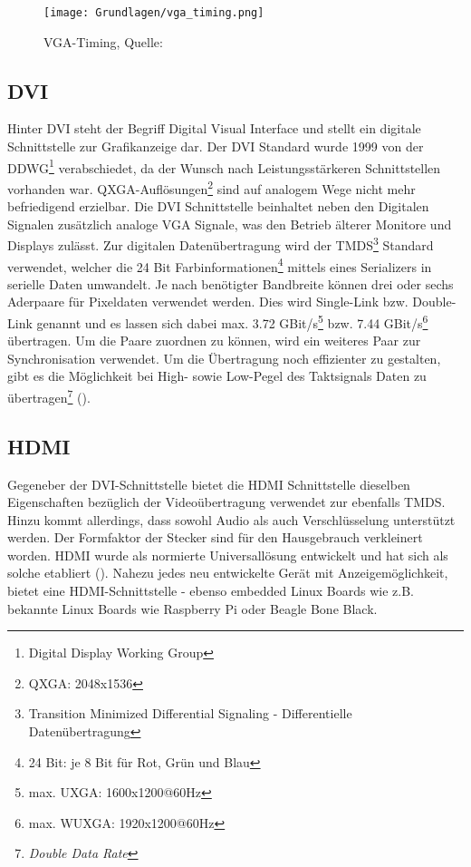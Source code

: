\begin{figure}[htp]
	\centering
	\texttt{[image: Grundlagen/vga\_timing.png]}
	\caption{VGA-Timing, Quelle: \cite{Valcarce2011}}
	\label{fig:vga_timing}
\end{figure}

\subsection{DVI}
Hinter DVI steht der Begriff Digital Visual Interface und stellt ein digitale Schnittstelle zur Grafikanzeige dar. Der DVI Standard wurde 1999 von der DDWG\footnote{Digital Display Working Group} verabschiedet, da der Wunsch nach Leistungsstärkeren Schnittstellen vorhanden war. QXGA-Auflösungen\footnote{QXGA: 2048x1536} sind auf analogem Wege nicht mehr befriedigend erzielbar. Die DVI Schnittstelle beinhaltet neben den Digitalen Signalen zusätzlich analoge VGA Signale, was den Betrieb älterer Monitore und Displays zulässt. Zur digitalen Datenübertragung wird der TMDS\footnote{Transition Minimized Differential Signaling - Differentielle Datenübertragung} Standard verwendet, welcher die 24 Bit Farbinformationen\footnote{24 Bit: je 8 Bit für Rot, Grün und Blau} mittels eines Serializers in serielle Daten umwandelt. Je nach benötigter Bandbreite können drei oder sechs Aderpaare für Pixeldaten verwendet werden. Dies wird Single-Link bzw. Double-Link genannt und es lassen sich dabei max. 3.72 GBit/s\footnote{max. UXGA: 1600x1200@60Hz} bzw. 7.44 GBit/s\footnote{max. WUXGA: 1920x1200@60Hz} übertragen. Um die Paare zuordnen zu können, wird ein weiteres Paar zur Synchronisation verwendet. Um die Übertragung noch effizienter zu gestalten, gibt es die Möglichkeit bei High- sowie Low-Pegel des Taktsignals Daten zu übertragen\footnote{\textit{Double Data Rate}} (\cite{Leunig2002}).

\subsection{HDMI}
Gegeneber der DVI-Schnittstelle bietet die HDMI Schnittstelle dieselben Eigenschaften bezüglich der Videoübertragung verwendet zur ebenfalls TMDS. Hinzu kommt allerdings, dass sowohl Audio als auch Verschlüsselung unterstützt werden. Der Formfaktor der Stecker sind für den Hausgebrauch verkleinert worden. HDMI wurde als normierte Universallösung entwickelt und hat sich als solche etabliert (\cite{Extron2014}). Nahezu jedes neu entwickelte Gerät mit Anzeigemöglichkeit, bietet eine HDMI-Schnittstelle - ebenso embedded Linux Boards wie z.B. bekannte Linux Boards wie Raspberry Pi oder Beagle Bone Black.

